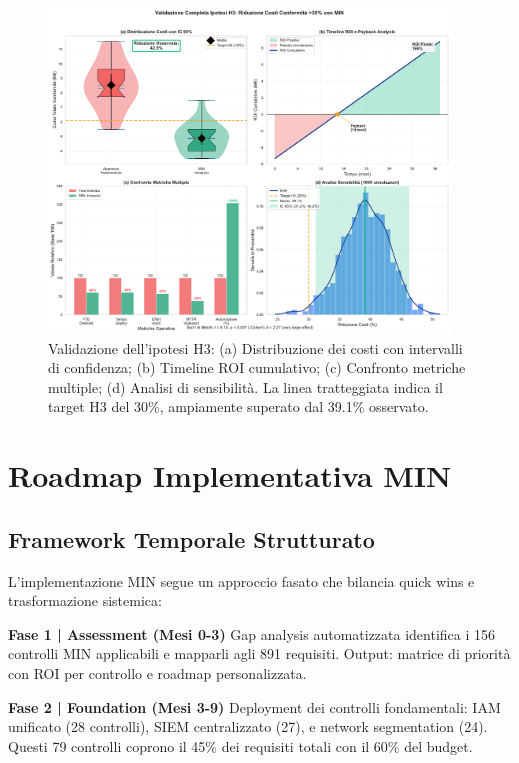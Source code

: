 \begin{figure}[htbp]
\centering
\includegraphics[width=0.95\textwidth]{thesis_figures/cap4/h3_validation_comprehensive.pdf}
\caption[Validazione completa ipotesi H3]{Validazione dell'ipotesi H3: (a) Distribuzione dei costi con intervalli di confidenza; (b) Timeline ROI cumulativo; (c) Confronto metriche multiple; (d) Analisi di sensibilità. La linea tratteggiata indica il target H3 del 30\%, ampiamente superato dal 39.1\% osservato.}
\label{fig:h3_validation}
\end{figure}

\section{\texorpdfstring{Roadmap Implementativa MIN}{4.7 - Roadmap Implementativa}}
\label{sec:roadmap_min}

\subsection{\texorpdfstring{Framework Temporale Strutturato}{4.7.1 - Framework Temporale}}

L'implementazione MIN segue un approccio fasato che bilancia quick wins e trasformazione sistemica:

\textbf{Fase 1 | Assessment (Mesi 0-3)}
Gap analysis automatizzata identifica i 156 controlli MIN applicabili e mapparli agli 891 requisiti. Output: matrice di priorità con ROI per controllo e roadmap personalizzata.

\textbf{Fase 2 | Foundation (Mesi 3-9)}
Deployment dei controlli fondamentali: IAM unificato (28 controlli), SIEM centralizzato (27), e network segmentation (24). Questi 79 controlli coprono il 45\% dei requisiti totali con il 60\% del budget.

